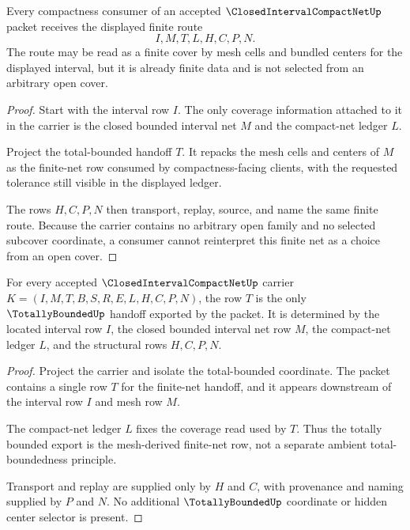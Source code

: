 \begin{theorem}
\label{thm:closed-interval-compact-net-finite-subcover-route}
Every compactness consumer of an accepted $\ClosedIntervalCompactNetUp$ packet receives the displayed finite route
$$
I,M,T,L,H,C,P,N.
$$
The route may be read as a finite cover by mesh cells and bundled centers for the displayed interval, but it is already finite data and is not selected from an arbitrary open cover.
\end{theorem}
\begin{proof}
Start with the interval row $I$. The only coverage information attached to it in the carrier is the closed bounded interval net $M$ and the compact-net ledger $L$.

Project the total-bounded handoff $T$. It repacks the mesh cells and centers of $M$ as the finite-net row consumed by compactness-facing clients, with the requested tolerance still visible in the displayed ledger.

The rows $H,C,P,N$ then transport, replay, source, and name the same finite route. Because the carrier contains no arbitrary open family and no selected subcover coordinate, a consumer cannot reinterpret this finite net as a choice from an open cover.
\end{proof}

\begin{theorem}
\label{thm:closed-interval-compact-net-totally-bounded-handoff}
For every accepted $\ClosedIntervalCompactNetUp$ carrier $K=(I,M,T,B,S,R,E,L,H,C,P,N)$, the row $T$ is the only $\TotallyBoundedUp$ handoff exported by the packet. It is determined by the located interval row $I$, the closed bounded interval net row $M$, the compact-net ledger $L$, and the structural rows $H,C,P,N$.
\end{theorem}
\begin{proof}
Project the carrier and isolate the total-bounded coordinate. The packet contains a single row $T$ for the finite-net handoff, and it appears downstream of the interval row $I$ and mesh row $M$.

The compact-net ledger $L$ fixes the coverage read used by $T$. Thus the totally bounded export is the mesh-derived finite-net row, not a separate ambient total-boundedness principle.

Transport and replay are supplied only by $H$ and $C$, with provenance and naming supplied by $P$ and $N$. No additional $\TotallyBoundedUp$ coordinate or hidden center selector is present.
\end{proof}

